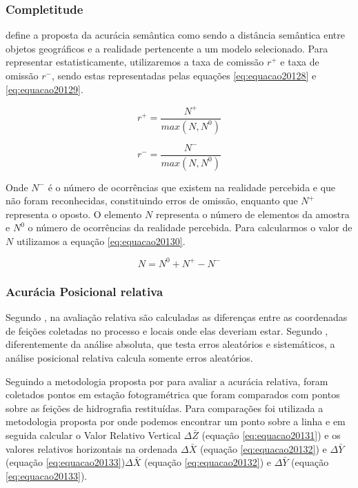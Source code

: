 \documentclass[12pt,a4paper]{article}
\begin{document}
		\subsubsection{Completitude}
		 define a proposta da acurácia semântica como sendo a distância semântica entre objetos geográficos e a realidade pertencente a um modelo selecionado. Para representar estatisticamente, utilizaremos a taxa de comissão $r^+$ e taxa de omissão $r^-$, sendo estas representadas pelas equações \ref{eq:equacao20128} e \ref{eq:equacao20129}.
	
		\begin{equation}
		r^+=\frac{N^+}{max(N,N^0)}
		\label{eq:equacao20128}
		\end{equation}
		
		\begin{equation}
		r^-=\frac{N^-}{max(N,N^0)}
		\label{eq:equacao20129}
		\end{equation}
		
		Onde $N^-$ é o número de ocorrências que existem na realidade percebida e que não foram	reconhecidas, constituindo erros de omissão, enquanto que $N^+$ representa o oposto. O elemento $N$ representa o número de elementos da amostra e $N^0$ o número de ocorrências da
		realidade percebida. Para calcularmos o valor de $N$ utilizamos a equação \ref{eq:equacao20130}.
		
		\begin{equation}
		N=N^0+N^+-N^-
		\label{eq:equacao20130}
		\end{equation}
		
		
		
		\subsubsection{Acurácia Posicional relativa}
		
		Segundo , na avaliação relativa são calculadas as diferenças entre as coordenadas de feições coletadas no	processo e locais onde elas deveriam estar. Segundo , diferentemente da	análise absoluta, que testa erros aleatórios e sistemáticos, a análise posicional relativa calcula somente erros aleatórios.
		
		Seguindo a metodologia proposta por  para avaliar a acurácia relativa,
		foram coletados pontos em estação fotogramétrica que foram comparados com
		pontos sobre as feições de hidrografia restituídas. Para comparações foi utilizada a metodologia proposta por  onde podemos encontrar um ponto sobre a linha e em seguida calcular o Valor
		Relativo Vertical  $\Delta  \bar{Z}$ (equação \ref{eq:equacao20131}) e os valores relativos horizontais na ordenada $\Delta  \bar{X}$ (equação \ref{eq:equacao20132}) e $\Delta  \bar{Y}$ (equação \ref{eq:equacao20133})$\Delta  \bar{X}$ (equação \ref{eq:equacao20132}) e $\Delta  \bar{Y}$ (equação \ref{eq:equacao20133}).
		
\end{document}
